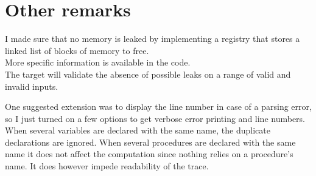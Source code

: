 \section{Other remarks}

I made sure that no memory is leaked by implementing a registry
that stores a linked list of blocks of memory to free.\\
More specific information is available in the code.\\
The  target will validate the absence of
possible leaks on a range of valid and invalid inputs.

One suggested extension was to display the line number in case
of a parsing error, so I just turned on a few options to get
verbose error printing and line numbers.\\

When several variables are declared with the same name, the
duplicate declarations are ignored. When several procedures are
declared with the same name it does not affect the computation
since nothing relies on a procedure's name. It does however impede
readability of the trace.
